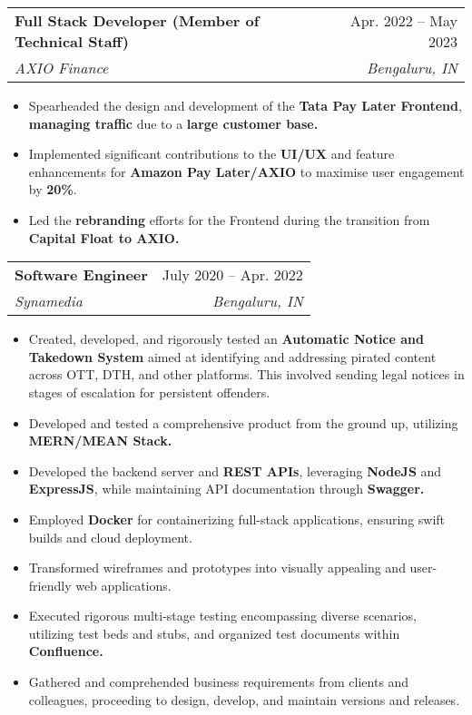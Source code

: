 \documentclass[letterpaper,11pt]{article}
\makeatletter
\newcommand{\resumeItem}[1]{
  \item\small{
    {#1 \vspace{-2pt}}
  }
}
\newcommand{\resumeSubheading}[4]{
  \vspace{-2pt}\item
    \begin{tabular*}{0.97\textwidth}[t]{l@{\extracolsep{\fill}}r}
      \textbf{#1} & #2 \\
      \textit{\small#3} & \textit{\small #4} \\
    \end{tabular*}\vspace{-7pt}
}
\newcommand{\resumeSubSubheading}[2]{
    \item
    \begin{tabular*}{0.97\textwidth}{l@{\extracolsep{\fill}}r}
      \textit{\small#1} & \textit{\small #2} \\
    \end{tabular*}\vspace{-7pt}
}
\newcommand{\resumeSubHeadingListEnd}{\end{itemize}}
\newcommand{\resumeItemListStart}{\begin{itemize}}
\newcommand{\resumeItemListEnd}{\end{itemize}\vspace{-5pt}}
\makeatother
\begin{document}

    \resumeSubheading
      {Full Stack Developer (Member of Technical Staff)}{Apr. 2022 -- May 2023}
      {AXIO Finance}{Bengaluru, IN}
      \resumeItemListStart
        \resumeItem{Spearheaded the design and development of the \textbf{Tata Pay Later Frontend}, \textbf{managing traffic} due to a \textbf{large customer base.}}
        \resumeItem{Implemented significant contributions to the \textbf{UI/UX} and feature enhancements for \textbf{Amazon Pay Later/AXIO} to maximise user engagement by \textbf{20\%}.}
        \resumeItem{Led the \textbf{rebranding} efforts for the Frontend during the transition from \textbf{Capital Float to AXIO.}}
    \resumeItemListEnd

    \resumeSubheading
      {Software Engineer}{July 2020 -- Apr. 2022}
      {Synamedia}{Bengaluru, IN}
      \resumeItemListStart
        \resumeItem{Created, developed, and rigorously tested an \textbf{Automatic Notice and Takedown System} aimed at identifying and addressing pirated content across OTT, DTH, and other platforms. This involved sending legal notices in stages of escalation for persistent offenders.}
        \resumeItem{Developed and tested a comprehensive product from the ground up, utilizing \textbf{MERN/MEAN Stack.}}
        \resumeItem{Developed the backend server and \textbf{REST APIs}, leveraging \textbf{NodeJS} and \textbf{ExpressJS}, while maintaining API documentation through \textbf{Swagger.}}
        \resumeItem{Employed \textbf{Docker} for containerizing full-stack applications, ensuring swift builds and cloud deployment.}
        \resumeItem{Transformed wireframes and prototypes into visually appealing and user-friendly web applications.}
        \resumeItem{Executed rigorous multi-stage testing encompassing diverse scenarios, utilizing test beds and stubs, and organized test documents within \textbf{Confluence.}}
        \resumeItem{Gathered and comprehended business requirements from clients and colleagues, proceeding to design, develop, and maintain versions and releases.}
      \resumeItemListEnd
\end{document}
